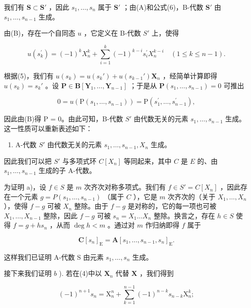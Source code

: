 我们有 \(\mathbf{S} \subset \mathbf{S}'\) ，因此 \(s_1, \ldots, s_n\) 属于 \(\mathbf{S}'\) ；由(A)和公式(6)，B-代数 \(\mathbf{S}'\) 由 \(s_1, \ldots, s_{n-1}\) 生成。

由(B)，存在一个自同态 \(u\) ，它定义在 B-代数 \(S'\) 上，使得

\[
u \left(s _ {k} ^ {\prime}\right) = (- 1) ^ {k} X _ {n} ^ {k} + \sum_ {i = 1} ^ {k} (- 1) ^ {k - i} s _ {i} ^ {\prime} X _ {n} ^ {k - i} \quad (1 \leqslant k \leqslant n - 1).\tag{7}
\]

根据(5)，我们有 \(u(s_k) = u(s_k') + u(s_{k-1}') \mathbf{X}_n\) ，经简单计算即得 \(u(s_k) = s_k'\) 。设 \(\mathbf{P} \in \mathbf{B}[\mathbf{Y}_1, \ldots, \mathbf{Y}_{n-1}]\) ；于是从 \(\mathbf{P}(s_1, \ldots, s_{n-1}) = 0\) 可推出

\[
0 = u \left(\mathrm{P} \left(s _ {1}, \dots , s _ {n - 1}\right)\right) = \mathrm{P} \left(s _ {1} ^ {\prime}, \dots , s _ {n - 1} ^ {\prime}\right),
\]

因此由(B)得 P = 0。由此可知，B-代数 \(S'\) 由代数无关的元素 \(s_{1}, \ldots, s_{n-1}\) 生成。这一性质可以重新表述如下：

\begin{enumerate}
\def\labelenumi{(\Alph{enumi})}
\setcounter{enumi}{3}
\tightlist
\item
  A-代数 \(S'\) 由代数无关的元素 \(s_1, \ldots, s_{n-1}, X_n\) 生成。
\end{enumerate}

因此我们可以把 \(S'\) 与多项式环 \(C[X_n]\) 等同起来，其中 \(C\) 是 \(E\) 的、由 \(s_1, \ldots, s_{n-1}\) 生成的子 A-代数。

为证明 a)，设 \(f \in S\) 是 \(m\) 次齐次对称多项式。我们有 \(f \in S' = C[X_n]\) ，因此存在一个元素 \(g = P(s_1, \ldots, s_{n-1})\) （属于 \(C\) ），它是 \(m\) 次齐次的（关于 \(X_1, \ldots, X_n\) ），使得 \(f - g\) 可被 \(X_n\) 整除。由于 \(f - g\) 是对称的，它的每一项也可被 \(X_1, \ldots, X_{n-1}\) 整除，因此 \(f - g\) 可被 \(s_n = X_1 \ldots X_n\) 整除。换言之，存在 \(h \in S\) 使得 \(f = g + hs_n\) ，从而 \(\deg h < m\) 。通过对 \(m\) 作归纳即得 \(f\) 属于

\[
\mathbf {C} \left[ s _ {n} \right] _ {\mathrm{E}} = \mathbf {A} \left[ s _ {1}, \dots , s _ {n - 1}, s _ {n} \right] _ {\mathrm{E}}.
\]

这样我们已证明 A-代数 S 由元素 \(s_{1}, \ldots, s_{n}\) 生成。

接下来我们证明 \(b\) ). 若在(4)中以 \(\mathbf{X}_n\) 代替 \(\mathbf{X}\) ，我们得到

\[
(- 1) ^ {n + 1} s _ {n} = \mathrm{X} _ {n} ^ {n} + \sum_ {k = 1} ^ {n - 1} (- 1) ^ {n - k} s _ {n - k} \mathrm{X} _ {n} ^ {k};
\]

